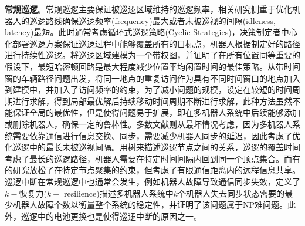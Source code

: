 \documentclass[finalformat,mathCMR]{HUSTthesis}
\begin{document}
\textbf{常规巡逻}。常规巡逻主要保证被巡逻区域维持的巡逻频率，相关研究侧重于优化机器人的巡逻路线确保巡逻频率(frequency)最大或者未被巡视的间隔(idleness, latency)最短。此时通常考虑循环式巡逻策略(Cyclic Strategies)，决策制定者中心化部署巡逻方案保证巡逻过程中能够覆盖所有的目标点，机器人根据制定好的路径进行持续性巡逻\citep{pasqualettiCooperativePatrollingWeighted2012, hongMultiRobotCooperativePatrolling2019}。\citep{chevaTheoreticalAnalysisMultiagent2004}将巡逻区域建模为一个带权图，并证明了在所有位置同等重要的假设下，最短哈密顿回路是最大程度减少位置平均闲置时间的最佳策略。\citep{stumpMultirobotPersistentSurveillance2011}从带时间窗的车辆路径问题出发，将同一地点的重复访问作为具有不同时间窗口的地点加入到建模中，并加入了访问频率的约束，为了减小问题的规模，设定在较短的时间周期进行求解，得到局部最优解后持续移动时间周期不断进行求解，此种方法虽然不能保证全局的最优性，但是使得问题易于扩展，即在多机器人系统中后续能够添加或删除机器人，确保一定的鲁棒性。多数文献则从最坏情况考虑，因为多机器人系统需要依靠通信进行信息交换、同步，需要减少机器人同步的延迟，因此考虑了优化巡逻中的最长未被巡视间隔\citep{pasqualettiCooperativePatrollingOptimal2012}。\citep{aldana-galvanOptimalCoverageTree2020}用树来描述巡逻节点之间的关系，巡逻的覆盖时间考虑了最长的巡逻路径，机器人需要在特定时间间隔内回到同一个顶点集合。而有的研究放松了在特定节点聚集的约束，但考虑了有限通信距离内的远程信息共享\citep{acevedoOneOneCoordinationAlgorithm2014, diaz-banezSynchronizationProblemInformation2015, schererMinmaxVertexCycle2022, caoGeneralFrameworkMultiUAV2023}。巡逻中断在常规巡逻中也通常会发生，例如机器人故障导致通信同步失效，\citep{beregComputingKresilienceSynchronized2018}定义了$k-$恢复力($k-$ resilience)描述多机器人系统中$k$个机器人失去同步状态需要的最少机器人故障个数以衡量整个系统的稳定性，并证明了该问题属于NP难问题。此外，巡逻中的电池更换也是使得巡逻中断的原因之一\citep{mathewMultirobotRendezvousPlanning2015, trottaJointCoverageConnectivity2018}。
\end{document}
